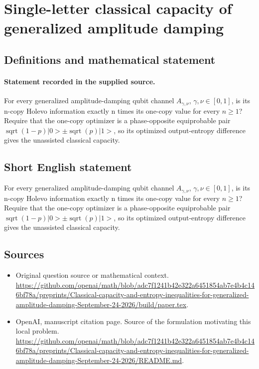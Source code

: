 \documentclass[11pt]{article}
\begin{document}
\section*{Single-letter classical capacity of generalized amplitude damping}\label{statement}
\subsection{Definitions and mathematical statement}
\paragraph{Statement recorded in the supplied source.}
For every generalized amplitude-damping qubit channel $A_{\gamma ,\nu }$, $\gamma ,\nu \in [0,1]$, is its n-copy Holevo information exactly n times its one-copy value for every $n\geq 1$? Require that the one-copy optimizer is a phase-opposite equiprobable pair $\operatorname{sqrt}(1-p)|0>\pm \operatorname{sqrt}(p)|1>$, so its optimized output-entropy difference gives the unassisted classical capacity.
\subsection{Short English statement}
For every generalized amplitude-damping qubit channel $A_{\gamma ,\nu }$, $\gamma ,\nu \in [0,1]$, is its n-copy Holevo information exactly n times its one-copy value for every $n\geq 1$? Require that the one-copy optimizer is a phase-opposite equiprobable pair $\operatorname{sqrt}(1-p)|0>\pm \operatorname{sqrt}(p)|1>$, so its optimized output-entropy difference gives the unassisted classical capacity.
\subsection{Sources}
\begin{itemize}
\item[S1] Original question source or mathematical context.
\url{https://github.com/openai/math/blob/adc7f1241b42e322a6451854ab7e4b4c146bf78a/preprints/Classical-capacity-and-entropy-inequalities-for-generalized-amplitude-damping-September-24-2026/build/paper.tex}.
\item[S2] OpenAI, manuscript citation page. Source of the formulation motivating this local problem.
\url{https://github.com/openai/math/blob/adc7f1241b42e322a6451854ab7e4b4c146bf78a/preprints/Classical-capacity-and-entropy-inequalities-for-generalized-amplitude-damping-September-24-2026/README.md}.
\end{itemize}
\end{document}
